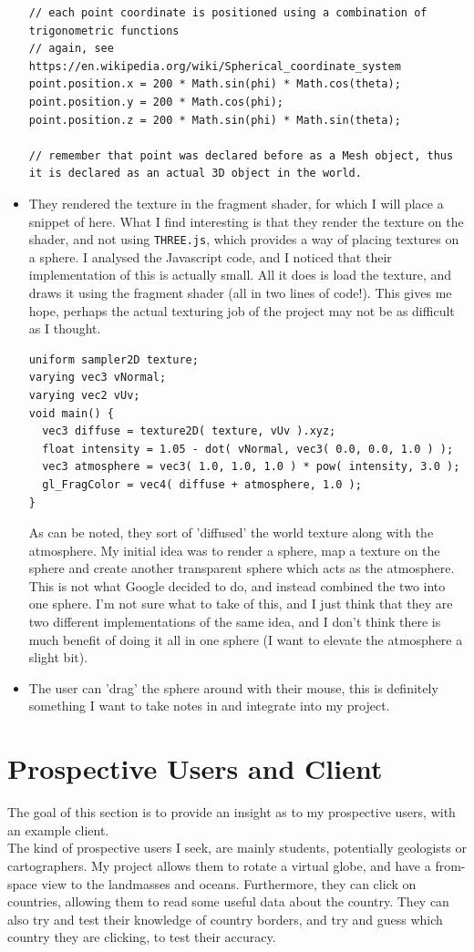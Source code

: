 \begin{itemize}
\begin{lstlisting}
// each point coordinate is positioned using a combination of trigonometric functions
// again, see https://en.wikipedia.org/wiki/Spherical_coordinate_system
point.position.x = 200 * Math.sin(phi) * Math.cos(theta);
point.position.y = 200 * Math.cos(phi);
point.position.z = 200 * Math.sin(phi) * Math.sin(theta);

// remember that point was declared before as a Mesh object, thus it is declared as an actual 3D object in the world.
\end{lstlisting}
\item They rendered the texture in the fragment shader, for which I will place a snippet of here. What I find interesting is that they render the texture on the shader, and not using \verb|THREE.js|, which provides a way of placing textures on a sphere. I analysed the Javascript code, and I noticed that their implementation of this is actually small. All it does is load the texture, and draws it using the fragment shader (all in two lines of code!). This gives me hope, perhaps the actual texturing job of the project may not be as difficult as I thought.
\begin{lstlisting}
uniform sampler2D texture;
varying vec3 vNormal;
varying vec2 vUv;
void main() {
  vec3 diffuse = texture2D( texture, vUv ).xyz;
  float intensity = 1.05 - dot( vNormal, vec3( 0.0, 0.0, 1.0 ) );
  vec3 atmosphere = vec3( 1.0, 1.0, 1.0 ) * pow( intensity, 3.0 );
  gl_FragColor = vec4( diffuse + atmosphere, 1.0 );
}
\end{lstlisting}
As can be noted, they sort of 'diffused' the world texture along with the atmosphere. My initial idea was to render a sphere, map a texture on the sphere and create another transparent sphere which acts as the atmosphere. This is not what Google decided to do, and instead combined the two into one sphere. I'm not sure what to take of this, and I just think that they are two different implementations of the same idea, and I don't think there is much benefit of doing it all in one sphere (I want to elevate the atmosphere a slight bit).
\item The user can 'drag' the sphere around with their mouse, this is definitely something I want to take notes in and integrate into my project.
\end{itemize}

\newpage

\section{Prospective Users and Client}
The goal of this section is to provide an insight as to my prospective users, with an example client. \\
The kind of prospective users I seek, are mainly students, potentially geologists or cartographers. My project allows them to rotate a virtual globe, and have a from-space view to the landmasses and oceans. Furthermore, they can click on countries, allowing them to read some useful data about the country. They can also try and test their knowledge of country borders, and try and guess which country they are clicking, to test their accuracy.

